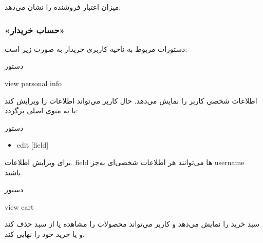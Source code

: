 \documentclass[]{article}
\begin{document}
میزان اعتبار فروشنده را نشان می‌دهد.


\newpage

\subsubsection*{{\titr «حساب خریدار»}}

دستورات مربوط به ناحیه کاربری خریدار به صورت زیر است:


\begin{mybox}[colback=yellow]{دستور}

\begin{latin}

view personal info

\end{latin}

\end{mybox}

اطلاعات شخصی کاربر را نمایش می‌دهد. حال کاربر می‌تواند اطلاعات را ویرایش کند یا به منوی اصلی برگردد:

\begin{mybox}[colback=brilliantlavender]{دستور}

\begin{latin}

\begin{itemize}[label = {$\Rightarrow$}]

\item
edit [field] 

\end{itemize}

\end{latin}

\end{mybox}

برای ویرایش اطلاعات. field ها می‌توانند هر اطلاعات شخصی‌ای به‌جز username باشند.

\hrulefill

\begin{mybox}[colback=yellow]{دستور}

\begin{latin}

view cart

\end{latin}

\end{mybox}

سبد خرید را نمایش می‌دهد و کاربر می‌تواند محصولات را مشاهده یا از سبد حذف کند و یا خرید خود را نهایی کند.
\end{document}
